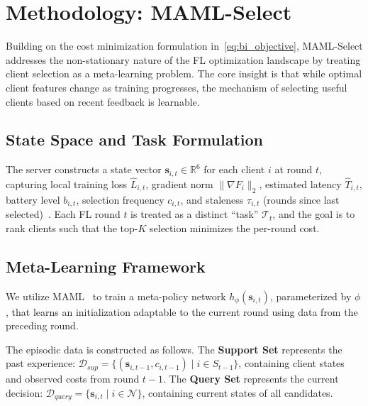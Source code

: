 \documentclass[journal]{IEEEtran}
\begin{document}
\section{Methodology: MAML-Select}
Building on the cost minimization formulation in~\eqref{eq:bi_objective}, MAML-Select addresses the non-stationary nature of the FL optimization landscape by treating client selection as a meta-learning problem. The core insight is that while optimal client features change as training progresses, the mechanism of selecting useful clients based on recent feedback is learnable.

\subsection{State Space and Task Formulation}
The server constructs a state vector $\bm{s}_{i,t} \in \mathbb{R}^6$ for each client $i$ at round $t$, capturing local training loss $\hat{L}_{i,t}$, gradient norm $\|\nabla F_i\|_2$, estimated latency $\hat{T}_{i,t}$, battery level $b_{i,t}$, selection frequency $c_{i,t}$, and staleness $\tau_{i,t}$ (rounds since last selected)~\cite{wang2020optimizing, lai2021oort}. Each FL round $t$ is treated as a distinct ``task'' $\mathcal{T}_t$, and the goal is to rank clients such that the top-$K$ selection minimizes the per-round cost.

\subsection{Meta-Learning Framework}
We utilize MAML~\cite{finn2017model} to train a meta-policy network $h_\phi(\bm{s}_{i,t})$, parameterized by $\phi$, that learns an initialization adaptable to the current round using data from the preceding round.

The episodic data is constructed as follows. The \textbf{Support Set} represents the past experience: $\mathcal{D}_{sup} = \{(\bm{s}_{i,t-1}, c_{i,t-1}) \mid i \in S_{t-1}\}$, containing client states and observed costs from round $t-1$. The \textbf{Query Set} represents the current decision: $\mathcal{D}_{query} = \{\bm{s}_{i,t} \mid i \in \mathcal{N}\}$, containing current states of all candidates.
\end{document}
